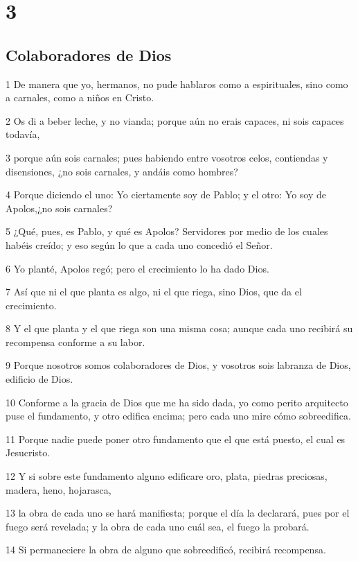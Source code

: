 \chapter{3}

\section*{Colaboradores de Dios}

\par 1 De manera que yo, hermanos, no pude hablaros como a espirituales, sino como a carnales, como a niños en Cristo.
\par 2 Os di a beber leche, y no vianda; porque aún no erais capaces, ni sois capaces todavía,
\par 3 porque aún sois carnales; pues habiendo entre vosotros celos, contiendas y disensiones, ¿no sois carnales, y andáis como hombres?
\par 4 Porque diciendo el uno: Yo ciertamente soy de Pablo; y el otro: Yo soy de Apolos,¿no sois carnales?
\par 5 ¿Qué, pues, es Pablo, y qué es Apolos? Servidores por medio de los cuales habéis creído; y eso según lo que a cada uno concedió el Señor.
\par 6 Yo planté, Apolos regó; pero el crecimiento lo ha dado Dios.
\par 7 Así que ni el que planta es algo, ni el que riega, sino Dios, que da el crecimiento.
\par 8 Y el que planta y el que riega son una misma cosa; aunque cada uno recibirá su recompensa conforme a su labor.
\par 9 Porque nosotros somos colaboradores de Dios, y vosotros sois labranza de Dios, edificio de Dios.
\par 10 Conforme a la gracia de Dios que me ha sido dada, yo como perito arquitecto puse el fundamento, y otro edifica encima; pero cada uno mire cómo sobreedifica.
\par 11 Porque nadie puede poner otro fundamento que el que está puesto, el cual es Jesucristo.
\par 12 Y si sobre este fundamento alguno edificare oro, plata, piedras preciosas, madera, heno, hojarasca,
\par 13 la obra de cada uno se hará manifiesta; porque el día la declarará, pues por el fuego será revelada; y la obra de cada uno cuál sea, el fuego la probará.
\par 14 Si permaneciere la obra de alguno que sobreedificó, recibirá recompensa.
